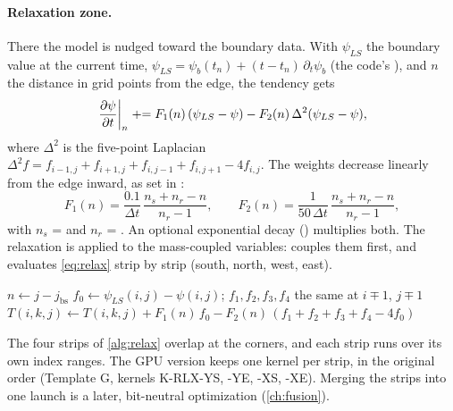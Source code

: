 \paragraph{Relaxation zone.} There the model is nudged toward the boundary data. With $\psi_{LS}$ the boundary value
at the current time, $\psi_{LS} = \psi_b(t_n) + (t - t_n)\,\partial_t\psi_b$ (the code's
), and $n$ the distance in grid points from the edge, the tendency gets
\begin{equation}
  \left.\frac{\partial \psi}{\partial t}\right|_n \mathrel{+}= F_1(n)\,(\psi_{LS} - \psi) - F_2(n)\,\Delta^2(\psi_{LS} - \psi),
  \label{eq:relax}
\end{equation}
where $\Delta^2$ is the five-point Laplacian
$\Delta^2 f = f_{i-1,j} + f_{i+1,j} + f_{i,j-1} + f_{i,j+1} - 4 f_{i,j}$. The weights decrease linearly from the
edge inward, as set in :
\begin{equation}
  F_1(n) = \frac{0.1}{\Delta t}\,\frac{n_s + n_r - n}{n_r - 1}, \qquad
  F_2(n) = \frac{1}{50\,\Delta t}\,\frac{n_s + n_r - n}{n_r - 1},
\end{equation}
with $n_s$ =  and $n_r$ = . An optional exponential decay ()
multiplies both. The relaxation is applied to the mass-coupled variables:  couples them first, and
 evaluates \cref{eq:relax} strip by strip (south, north, west, east).

\begin{algorithm}[ht]
\caption{The southern strip of  for one field.}
\label{alg:relax}
\begin{algorithmic}[1]
  \State $n \gets j - j_{\mathrm{bs}}$ 
    \State $f_0 \gets \psi_{LS}(i,j) - \psi(i,j)$; \quad $f_1, f_2, f_3, f_4$ the same at $i\mp1$, $j\mp1$
    \State $T(i,k,j) \gets T(i,k,j) + F_1(n)\,f_0 - F_2(n)\,(f_1 + f_2 + f_3 + f_4 - 4 f_0)$
  \EndFor
\EndFor
\end{algorithmic}
\end{algorithm}

\begin{portnote}
The four strips of \cref{alg:relax} overlap at the corners, and each strip runs over its own index ranges. The GPU
version keeps one kernel per strip, in the original order (Template G, kernels K-RLX-YS, -YE, -XS, -XE). Merging the
strips into one launch is a later, bit-neutral optimization (\cref{ch:fusion}).
\end{portnote}

